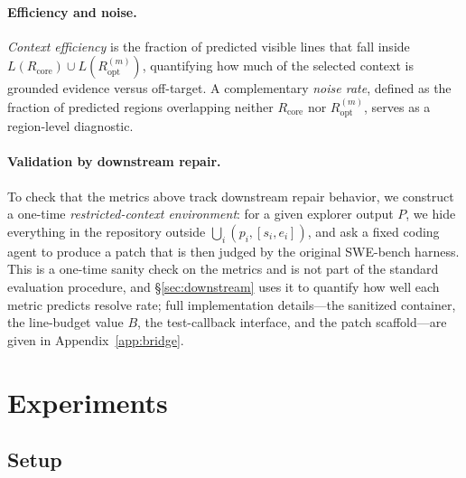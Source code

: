 \documentclass{llmxive}
\begin{document}
 

\paragraph{Efficiency and noise.}
\emph{Context efficiency} is the fraction of predicted visible lines that fall inside $L(R_{\text{core}}) \cup L(R_{\text{opt}}^{(m)})$, quantifying how much of the selected context is grounded evidence versus off-target. A complementary \emph{noise rate}, defined as the fraction of predicted regions overlapping neither $R_{\text{core}}$ nor $R_{\text{opt}}^{(m)}$, serves as a region-level diagnostic.







 
\paragraph{Validation by downstream repair.}\label{sec:bridge}
To check that the metrics above track downstream repair behavior, we construct a one-time \emph{restricted-context environment}: for a given explorer output $P$, we hide everything in the repository outside $\bigcup_i (p_i, [s_i, e_i])$, and ask a fixed coding agent to produce a patch that is then judged by the original SWE-bench harness. This is a one-time sanity check on the metrics and is not part of the standard evaluation procedure, and \S\ref{sec:downstream} uses it to quantify how well each metric predicts resolve rate; full implementation details---the sanitized container, the line-budget value $B$, the test-callback interface, and the patch scaffold---are given in Appendix~\ref{app:bridge}.














 
\section{Experiments}

 
\subsection{Setup}

 
\end{document}
